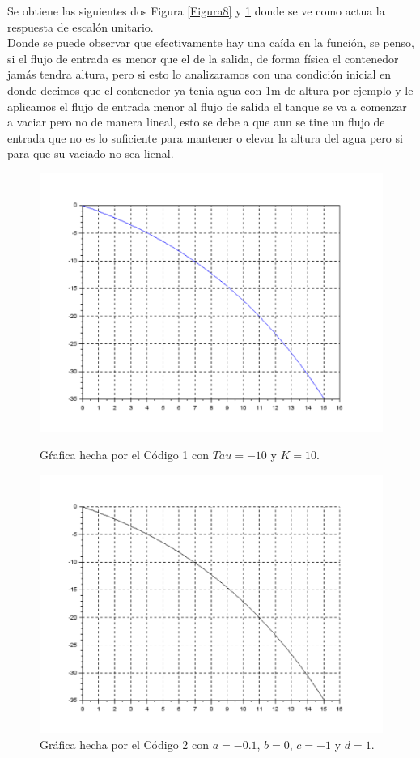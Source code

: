 \documentclass[12pt,a4paper]{article}
\begin{document}
Se obtiene las siguientes dos Figura \ref{Figura8} y \ref{Figura9} donde se ve como actua la respuesta de escalón unitario.\\[12pt]
Donde se puede observar que efectivamente hay una caída en la función, se penso, si el flujo de entrada es menor que el de la salida, de forma física el contenedor jamás tendra altura, pero si esto lo analizaramos con una condición inicial en donde decimos que el contenedor ya tenia agua con 1m de altura por ejemplo y le aplicamos el flujo de entrada menor al flujo de salida el tanque se va a comenzar a vaciar pero no de manera lineal, esto se debe a que aun se tine un flujo de entrada que no es lo suficiente para mantener o elevar la altura del agua pero si para que su vaciado no sea lienal.
\begin{figure}[h!]
\begin{minipage}{8cm} 
\centering
\includegraphics[scale=0.5]{WiMenorWo_profe.pdf}
\caption{Gŕafica hecha por el Código 1 con $Tau=-10$ y $K=10$.}
\label{Figura8}
\end{minipage}
\hspace{0.5cm}
\begin{minipage}{8cm}
\centering
\includegraphics[scale=0.5]{WiMenorWo_yo.pdf}
\caption{Gráfica hecha por el Código 2 con $a = -0.1$, $b = 0$, $c =-1$ y $d = 1$.}
\label{Figura9}
\end{minipage}
\end{figure}\\
\end{document}

